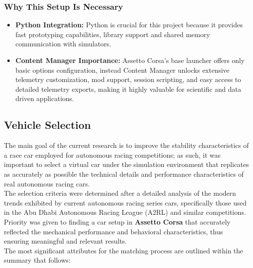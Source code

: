 \documentclass[a4paper,final,12pt]{report}
\begin{document}
\subsubsection{Why This Setup Is Necessary}
\begin{itemize}
    \item \textbf{Python Integration:}  Python is crucial for this project because it provides fast prototyping capabilities, library support and shared memory communication with simulators. 
    \item \textbf{Content Manager Importance:} Assetto Corsa’s base launcher offers only basic options configuration, instead Content Manager unlocks extensive telemetry customization, mod support, session scripting, and easy access to detailed telemetry exports, making it highly valuable for scientific and data driven applications.
\end{itemize}

\subsection{Vehicle Selection}
The main goal of the current research is to improve the stability characteristics of a race car employed for autonomous racing competitions; as such, it was important to select a virtual car under the simulation environment that replicates as accurately as possible the technical details and performance characteristics of real autonomous racing cars.\\

The selection criteria were determined after a detailed analysis of the modern trends exhibited by current autonomous racing series cars, specifically those used in the Abu Dhabi Autonomous Racing League (A2RL) and similar competitions. Priority was given to finding a car setup in \textbf{Assetto Corsa} that accurately reflected the mechanical performance and behavioral characteristics, thus ensuring meaningful and relevant results.\\

The most significant attributes for the matching process are outlined within the summary that follows:
\end{document}
